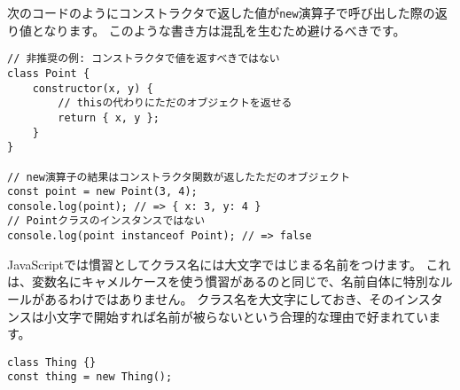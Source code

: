 次のコードのようにコンストラクタで返した値が\texttt{new}演算子で呼び出した際の返り値となります。
このような書き方は混乱を生むため避けるべきです。
\vspace{-1mm}
\begin{lstlisting}
// 非推奨の例: コンストラクタで値を返すべきではない
class Point {
    constructor(x, y) {
        // thisの代わりにただのオブジェクトを返せる
        return { x, y };
    }
}

// new演算子の結果はコンストラクタ関数が返したただのオブジェクト
const point = new Point(3, 4);
console.log(point); // => { x: 3, y: 4 }
// Pointクラスのインスタンスではない
console.log(point instanceof Point); // => false
\end{lstlisting}
\vspace{-1mm}
\begin{note}{}
\hypertarget{class-name-start-upper-case}{%
\underline{}\label{class-name-start-upper-case}}

JavaScriptでは慣習としてクラス名には大文字ではじまる名前をつけます。
これは、変数名にキャメルケースを使う慣習があるのと同じで、名前自体に特別なルールがあるわけではありません。
クラス名を大文字にしておき、そのインスタンスは小文字で開始すれば名前が被らないという合理的な理由で好まれています。

\begin{lstlisting}
class Thing {}
const thing = new Thing();
\end{lstlisting}
\end{note}

